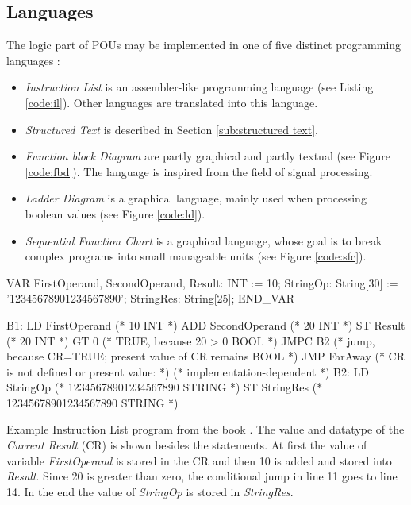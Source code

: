 \pagebreak
\subsection{Languages}
\label{sub:iec-lang}
The logic part of POUs may be implemented in one of five distinct programming languages \cite{johnIEC611313Programming2010}:
\begin{itemize}
	\item \emph{Instruction List} is an assembler-like programming language (see Listing \ref{code:il}). Other languages are translated into this language.
	\item \emph{Structured Text} is described in Section \ref{sub:structured text}.
	\item \emph{Function block Diagram} are partly graphical and partly textual (see Figure \ref{code:fbd}). The language is inspired from the field of signal processing. 
	\item \emph{Ladder Diagram} is a graphical language, mainly used when processing boolean values (see Figure \ref{code:ld}).
	\item \emph{Sequential Function Chart} is a graphical language, whose goal is to break complex programs into small manageable units (see Figure \ref{code:sfc}). 
\end{itemize}

\begin{program}[h!]
	\begin{GenericCode}
VAR
	FirstOperand, SecondOperand, Result: INT := 10;
	StringOp: String[30] := '12345678901234567890';
	StringRes: String[25];
END_VAR
		
B1:	LD FirstOperand (* 10 {INT} *)
ADD SecondOperand (* 20 {INT} *)
ST Result (* 20 {INT} *)
GT 0 (* TRUE, because 20 > 0 {BOOL} *)
JMPC B2 (* jump, because CR=TRUE; present value of CR remains {BOOL} *)
JMP FarAway (* CR is not defined or present value: *)
(* implementation-dependent *)
B2: LD StringOp (* 12345678901234567890 {STRING} *)
ST StringRes (* 12345678901234567890 {STRING} *)\end{GenericCode}
	\caption{Example Instruction List program from the book \cite{johnIEC611313Programming2010}. The value and datatype of the \emph{Current Result} (CR) is shown besides the statements. At first the value of variable \emph{FirstOperand} is stored in the CR and then 10 is added and stored into \emph{Result}. Since 20 is greater than zero, the conditional jump in line 11 goes to line 14. In the end the value of \emph{StringOp} is stored in \emph{StringRes}. }
	\label{code:il}
\end{program}

